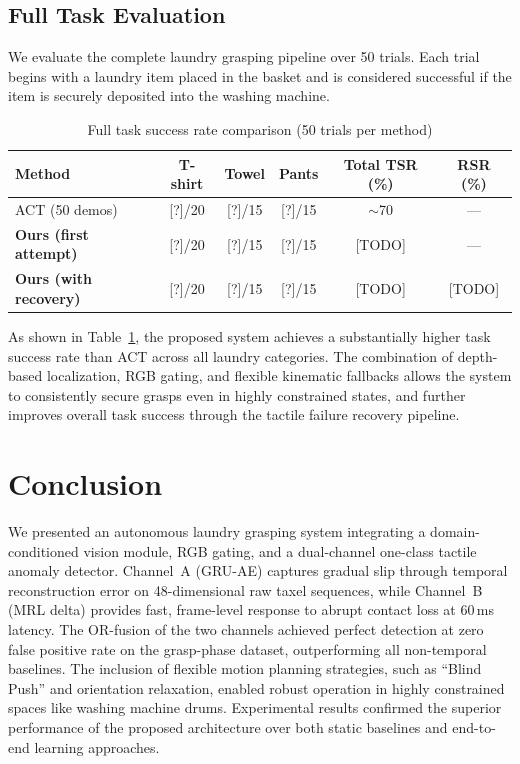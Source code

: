 \documentclass[pdflatex,sn-mathphys-num]{sn-jnl}%
\theoremstyle{thmstyleone}%
\theoremstyle{thmstyletwo}%
\theoremstyle{thmstylethree}%
\begin{document}
\subsection{Full Task Evaluation}
We evaluate the complete laundry grasping pipeline over 50 trials. Each trial begins with a laundry item placed in the basket and is considered successful if the item is securely deposited into the washing machine.

\begin{table}[h]
\caption{Full task success rate comparison (50 trials per method)}
\label{tab:task_eval}
\centering
\begin{tabular}{lccccc}
\hline
Method & T-shirt & Towel & Pants & Total TSR (\%) & RSR (\%) \\
\hline
ACT (50 demos)
  & [?]/20 & [?]/15 & [?]/15 & $\sim$70 & — \\
\textbf{Ours (first attempt)}
  & [?]/20 & [?]/15 & [?]/15 & [TODO] & — \\
\textbf{Ours (with recovery)}
  & [?]/20 & [?]/15 & [?]/15 & [TODO] & [TODO] \\
\hline
\end{tabular}
\end{table}

As shown in Table~\ref{tab:task_eval}, the proposed system achieves a substantially higher task success rate than ACT across all laundry categories. The combination of depth-based localization, RGB gating, and flexible kinematic fallbacks allows the system to consistently secure grasps even in highly constrained states, and further improves overall task success through the tactile failure recovery pipeline.

\section{Conclusion}
\label{sec:conclusion}
We presented an autonomous laundry grasping system integrating a domain-conditioned vision module, RGB gating, and a dual-channel one-class tactile anomaly detector. Channel~A (GRU-AE) captures gradual slip through temporal reconstruction error on 48-dimensional raw taxel sequences, while Channel~B (MRL delta) provides fast, frame-level response to abrupt contact loss at 60\,ms latency. The OR-fusion of the two channels achieved perfect detection at zero false positive rate on the grasp-phase dataset, outperforming all non-temporal baselines. The inclusion of flexible motion planning strategies, such as ``Blind Push'' and orientation relaxation, enabled robust operation in highly constrained spaces like washing machine drums. Experimental results confirmed the superior performance of the proposed architecture over both static baselines and end-to-end learning approaches.


\end{document}
